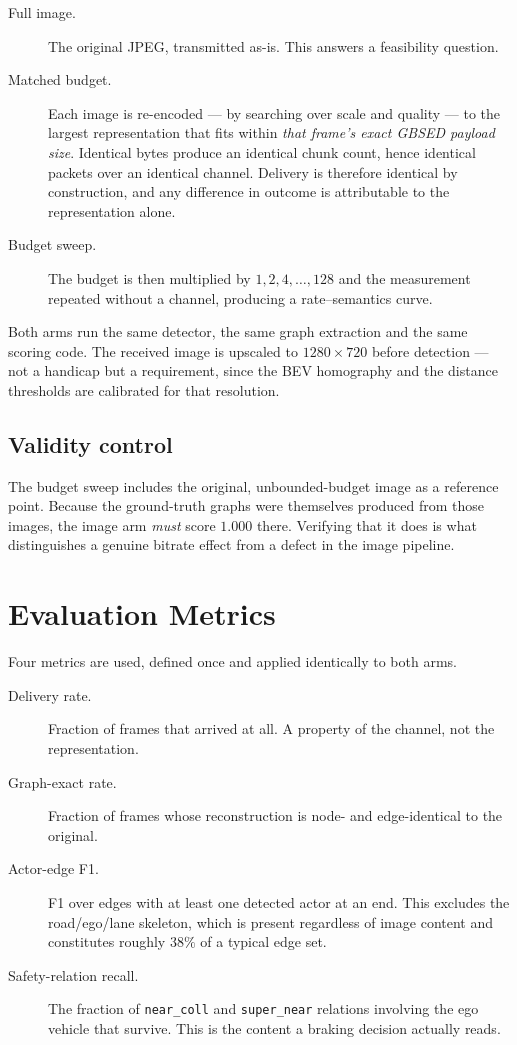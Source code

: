 \documentclass{iutbscthesis}
\begin{document}
\begin{description}
    \item[Full image.] The original JPEG, transmitted as-is. This answers a
    feasibility question.
    \item[Matched budget.] Each image is re-encoded --- by searching over scale
    and quality --- to the largest representation that fits within \emph{that
    frame's exact GBSED payload size}. Identical bytes produce an identical
    chunk count, hence identical packets over an identical channel. Delivery is
    therefore identical by construction, and any difference in outcome is
    attributable to the representation alone.
    \item[Budget sweep.] The budget is then multiplied by $1, 2, 4, \ldots, 128$
    and the measurement repeated without a channel, producing a
    rate--semantics curve.
\end{description}

Both arms run the same detector, the same graph extraction and the same scoring
code. The received image is upscaled to $1280 \times 720$ before detection ---
not a handicap but a requirement, since the BEV homography and the distance
thresholds are calibrated for that resolution.

\subsection{Validity control}

The budget sweep includes the original, unbounded-budget image as a reference
point. Because the ground-truth graphs were themselves produced from those
images, the image arm \emph{must} score $1.000$ there. Verifying that it does
is what distinguishes a genuine bitrate effect from a defect in the image
pipeline.

\section{Evaluation Metrics}

Four metrics are used, defined once and applied identically to both arms.

\begin{description}
    \item[Delivery rate.] Fraction of frames that arrived at all. A property of
    the channel, not the representation.
    \item[Graph-exact rate.] Fraction of frames whose reconstruction is node-
    and edge-identical to the original.
    \item[Actor-edge F1.] F1 over edges with at least one detected actor at an
    end. This excludes the road/ego/lane skeleton, which is present regardless
    of image content and constitutes roughly $38\%$ of a typical edge set.
    \item[Safety-relation recall.] The fraction of \texttt{near\_coll} and
    \texttt{super\_near} relations involving the ego vehicle that survive.
    This is the content a braking decision actually reads.
\end{description}
\end{document}

